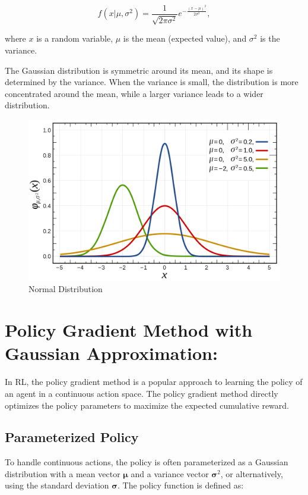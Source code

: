 \begin{equation}
    f(x | \mu, \sigma^2) = \frac{1}{\sqrt{2\pi\sigma^2}} e^{-\frac{(x-\mu)^2}{2\sigma^2}},\label{eq:equation}
\end{equation}

where $x$ is a random variable, $\mu$ is the mean (expected value), and $\sigma^2$ is the variance.

The Gaussian distribution is symmetric around its mean, and its shape is determined by the variance. When the variance is small, the distribution is more concentrated around the mean, while a larger variance leads to a wider distribution.
\begin{figure}[!h]
    \centering
    \includegraphics[width=12cm]{assets/normal}
    \caption{Normal Distribution}\label{fig:guassian-distribution}
\end{figure}

\section{Policy Gradient Method with Gaussian Approximation:}\label{sec:policy-gradient-method-with-gaussian-approximation:}
In RL, the policy gradient method is a popular approach to learning the policy of an agent in a continuous action space.
The policy gradient method directly optimizes the policy parameters to maximize the expected cumulative reward.

\subsection{Parameterized Policy}\label{subsec:parameterized-policy}
To handle continuous actions, the policy is often parameterized as a Gaussian distribution with a mean vector $\boldsymbol{\mu}$ and a variance vector $\boldsymbol{\sigma}^2$, or alternatively, using the standard deviation $\boldsymbol{\sigma}$. The policy function is defined as:

